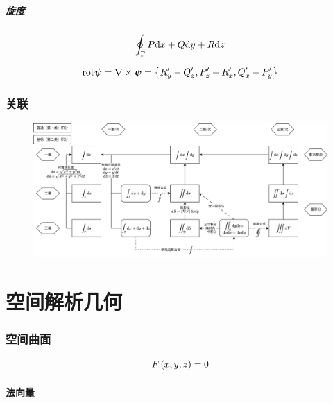 \documentclass{article}
\begin{document}
\subsubsection{旋度}

\begin{definition}
    \[\oint_\Gamma P\mathrm d x+Q\mathrm d y+R \mathrm d z\]
\end{definition}

\begin{theorem}[旋度]
    \[\mathrm{rot}\boldsymbol\psi=
        \nabla\times\boldsymbol\psi=\left\{
            R_y^\prime-Q_z^\prime,
            P_z^\prime-R_x^\prime,
            Q_x^\prime-P_y^\prime\right\}\]
\end{theorem}

\section{关联}

\begin{figure}[H]
    \centering
    \includegraphics[width=\linewidth]{RelationshipsOfMultipleIntegrals.png}
\end{figure}

\part{空间解析几何}

\section{空间曲面}

\begin{definition}[]
    \[F\left(x,y,z\right)=0\]
\end{definition}

\subsection{法向量}
\end{document}
